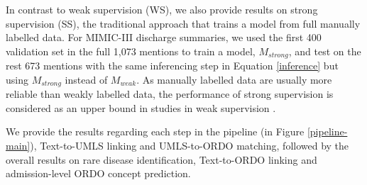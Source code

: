 \documentclass[twocolumn]{bmcart}
\begin{document}
In contrast to weak supervision (WS), we also provide results on strong supervision (SS), the traditional approach that trains a model from full manually labelled data. For MIMIC-III discharge summaries, we used the first 400 validation set in the full 1,073 mentions to train a model, $M_{strong}$, and test on the rest 673 mentions with the same inferencing step in Equation \ref{inference} but using $M_{strong}$ instead of $M_{weak}$. As manually labelled data are usually more reliable than weakly labelled data, the performance of strong supervision is considered as an upper bound in studies in weak supervision \cite{fries2021ontology,ratner2020snorkel}.

We provide the results regarding each step in the pipeline (in Figure \ref{pipeline-main}), Text-to-UMLS linking and UMLS-to-ORDO matching, followed by the overall results on rare disease identification, Text-to-ORDO linking and admission-level ORDO concept prediction.
\end{document}
